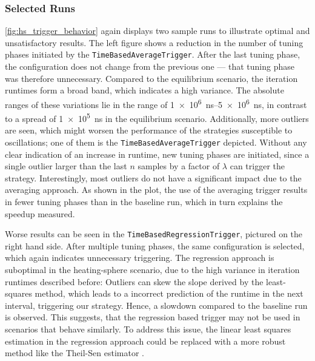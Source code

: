 \subsubsection{Selected Runs}
\autoref{fig:hs_trigger_behavior} again displays two sample runs to illustrate optimal and unsatisfactory results. The left figure shows a reduction in the number of tuning phases initiated by the \texttt{TimeBasedAverageTrigger}. After the last tuning phase, the configuration does not change from the previous one --- that tuning phase was therefore unnecessary. Compared to the equilibrium scenario, the iteration runtimes form a broad band, which indicates a high variance. The absolute ranges of these variations lie in the range of \SIrange{1e6}{5e6}{\nano\second}, in contrast to a spread of \qty{1e5}{\nano\second} in the equilibrium scenario. Additionally, more outliers are seen, which might worsen the performance of the strategies susceptible to oscillations; one of them is the \texttt{TimeBasedAverageTrigger} depicted. Without any clear indication of an increase in runtime, new tuning phases are initiated, since a single outlier larger than the last $n$ samples by a factor of $\lambda$ can trigger the strategy. Interestingly, most outliers do not have a significant impact due to the averaging approach. As shown in the plot, the use of the averaging trigger results in fewer tuning phases than in the baseline run, which in turn explains the speedup measured.

Worse results can be seen in the \texttt{TimeBasedRegressionTrigger}, pictured on the right hand side. After multiple tuning phases, the same configuration is selected, which again indicates unnecessary triggering. The regression approach is suboptimal in the heating-sphere scenario, due to the high variance in iteration runtimes described before: Outliers can skew the slope derived by the least-squares method, which leads to a incorrect prediction of the runtime in the next interval, triggering our strategy. Hence, a slowdown compared to the baseline run is observed. This suggests, that the regression based trigger may not be used in scenarios that behave similarly. To address this issue, the linear least squares estimation in the regression approach could be replaced with a more robust method like the Theil-Sen estimator \cite{Wilcox2012}.


